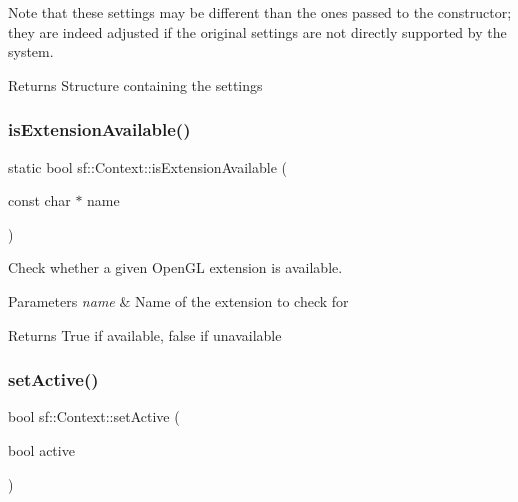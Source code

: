 Note that these settings may be different than the ones passed to the constructor; they are indeed adjusted if the original settings are not directly supported by the system.

\begin{DoxyReturn}{Returns}
Structure containing the settings 
\end{DoxyReturn}
\mbox{\label{classsf_1_1_context_a163c7f72c0c20133606657d895faa147}} 
\subsubsection{\texorpdfstring{is\+Extension\+Available()}{isExtensionAvailable()}}
{\footnotesize\ttfamily static bool sf\+::\+Context\+::is\+Extension\+Available (\begin{DoxyParamCaption}\item[{const char $\ast$}]{name }\end{DoxyParamCaption})\hspace{0.3cm}{\ttfamily [static]}}



Check whether a given Open\+GL extension is available. 


\begin{DoxyParams}{Parameters}
{\em name} & Name of the extension to check for\\
\hline
\end{DoxyParams}
\begin{DoxyReturn}{Returns}
True if available, false if unavailable 
\end{DoxyReturn}
\mbox{\label{classsf_1_1_context_a0806f915ea81ae1f4e8135a7a3696562}} 
\subsubsection{\texorpdfstring{set\+Active()}{setActive()}}
{\footnotesize\ttfamily bool sf\+::\+Context\+::set\+Active (\begin{DoxyParamCaption}\item[{bool}]{active }\end{DoxyParamCaption})}



